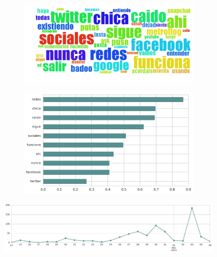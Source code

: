 \begin{figure}[htbp!]
    \centering
    \begin{subfigure}[b]{0.49\textwidth}
        \includegraphics[width=\textwidth]{twitter_all/report_images/topic-11-wordcloud.jpg}
    \end{subfigure}
    \begin{subfigure}[b]{0.49\textwidth}
        \includegraphics[width=\textwidth]{twitter_all/report_images/topic-11-terms.jpg}
    \end{subfigure}
\end{figure}

\begin{figure}[htbp!]
    \centering
    \includegraphics[width=\textwidth]{twitter_all/report_images/topic-11-timeseries.jpg}
\end{figure}

